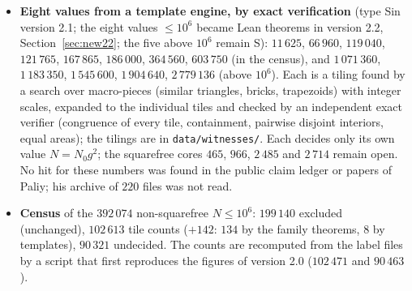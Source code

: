 \documentclass[11pt,reqno]{amsart}
\theoremstyle{plain}
\theoremstyle{definition}
\newcommand{\sS}{\textup{\textsf{S}}}
\begin{document}
\begin{itemize}
\item \textbf{Eight values from a template engine, by exact verification} (type \sS in version 2.1; the eight values $\le10^6$ became Lean theorems in version 2.2, Section~\ref{sec:new22}; the five above $10^6$ remain \sS): $11\,625$, $66\,960$, $119\,040$, $121\,765$, $167\,865$, $186\,000$, $364\,560$, $603\,750$ (in the census), and $1\,071\,360$, $1\,183\,350$, $1\,545\,600$, $1\,904\,640$, $2\,779\,136$ (above $10^6$). Each is a tiling found by a search over macro-pieces (similar triangles, bricks, trapezoids) with integer scales, expanded to the individual tiles and checked by an independent exact verifier (congruence of every tile, containment, pairwise disjoint interiors, equal areas); the tilings are in \texttt{data/witnesses/}. Each decides only its own value $N=N_0g^2$; the squarefree cores $465$, $966$, $2\,485$ and $2\,714$ remain open. No hit for these numbers was found in the public claim ledger or papers of Paliy; his archive of $220$ files was not read.
\item \textbf{Census} of the $392\,074$ non-squarefree $N\le10^6$: $199\,140$ excluded (unchanged), $102\,613$ tile counts ($+142$: $134$ by the family theorems, $8$ by templates), $90\,321$ undecided. The counts are recomputed from the label files by a script that first reproduces the figures of version 2.0 ($102\,471$ and $90\,463$).
\end{itemize}
\end{document}
